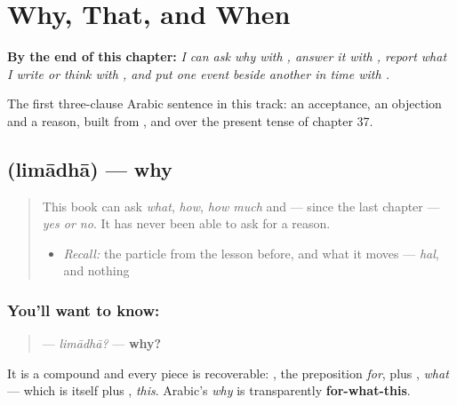 
\chapter{Why, That, and When}
\label{ch:ar-why-that-and-when}

\begin{chapteropening}
\textbf{By the end of this chapter:} \emph{I can ask why with , answer it with , report what I write or think with , and put one event beside another in time with .}

The first three-clause Arabic sentence in this track: an acceptance, an objection and a reason, built from ,  and  over the present tense of chapter 37.
\end{chapteropening}

\section[\texorpdfstring{\ar{لماذا؟} (limādhā?)}{لماذا؟ (limādhā?)}]{ (limādhā) — why}

\label{lesson:AR-C40-limadha}



\begin{quote}
This book can ask \emph{what}, \emph{how}, \emph{how much} and — since the last chapter — \emph{yes or no}. It has never been able to ask for a reason.

\begin{itemize}
\raggedright
  \item \emph{Recall:} the particle from the lesson before, and what it moves — \emph{hal}, and nothing
\end{itemize}
\end{quote}

\subsection*{You'll want to know: }
\begin{quote}
\textbf{} — \emph{limādhā?} — \textbf{why?}
\end{quote}

It is a compound and every piece is recoverable: \textbf{}, the preposition \emph{for}, plus \textbf{}, \emph{what} — which is itself \textbf{} plus \textbf{}, \emph{this}. Arabic's \emph{why} is transparently \textbf{for-what-this}.

